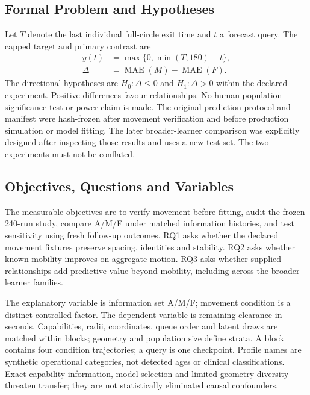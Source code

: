 \documentclass[conference]{IEEEtran}
\newcommand{\MAE}{\operatorname{MAE}}
\begin{document}
\subsection{Formal Problem and Hypotheses}
Let $T$ denote the last individual full-circle exit time and $t$ a forecast query. The capped target and primary contrast are
\begin{align}
y(t)&=\max\{0,\min(T,180)-t\},\\
\Delta&=\MAE(M)-\MAE(F).
\end{align}
The directional hypotheses are $H_0:\Delta\leq0$ and $H_1:\Delta>0$ within the declared experiment. Positive differences favour relationships. No human-population significance test or power claim is made. The original prediction protocol and manifest were hash-frozen after movement verification and before production simulation or model fitting. The later broader-learner comparison was explicitly designed after inspecting those results and uses a new test set. The two experiments must not be conflated.

\subsection{Objectives, Questions and Variables}
The measurable objectives are to verify movement before fitting, audit the frozen 240-run study, compare A/M/F under matched information histories, and test sensitivity using fresh follow-up outcomes. RQ1 asks whether the declared movement fixtures preserve spacing, identities and stability. RQ2 asks whether known mobility improves on aggregate motion. RQ3 asks whether supplied relationships add predictive value beyond mobility, including across the broader learner families.

The explanatory variable is information set A/M/F; movement condition is a distinct controlled factor. The dependent variable is remaining clearance in seconds. Capabilities, radii, coordinates, queue order and latent draws are matched within blocks; geometry and population size define strata. A block contains four condition trajectories; a query is one checkpoint. Profile names are synthetic operational categories, not detected ages or clinical classifications. Exact capability information, model selection and limited geometry diversity threaten transfer; they are not statistically eliminated causal confounders.
\end{document}
